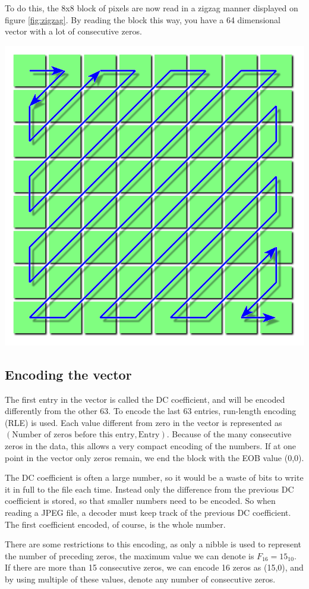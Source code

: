 \begin{infobox}
To do this, the 8x8 block of pixels are now read in a zigzag manner displayed on figure \ref{fig:zigzag}.
By reading the block this way, you have a 64 dimensional vector with a lot of consecutive zeros. 

\begin{centering}
\includegraphics[width=.5\textwidth]{figures/zigzagordering.png}
\label{fig:zigzag}
\end{centering} 

\vspace{4mm}
\subsection{Encoding the vector}
\vspace{-2.5mm}
The first entry in the vector is called the DC coefficient, and will be encoded differently from the other 63. To encode the last 63 entries, run-length encoding (RLE) is used. Each value different from zero in the vector is represented as $(\text{Number of zeros before this entry}, \text{Entry})$. Because of the many consecutive zeros in the data, this allows a very compact encoding of the numbers. If at one point in the vector only zeros remain, we end the block with the EOB value (0,0). 

The DC coefficient is often a large number, so it would be a waste of bits to write it in full to the file each time. Instead only the difference from the previous DC coefficient is stored, so that smaller numbers need to be encoded. So when reading a JPEG file, a decoder must keep track of the previous DC coefficient. The first coefficient encoded, of course, is the whole number.

There are some restrictions to this encoding, as only a nibble is used to represent the number of preceding zeros, the maximum value we can denote is $F_{16}=15_{10}$.
If there are more than 15 consecutive zeros, we can encode 16 zeros as (15,0), and by using multiple of these values, denote any number of consecutive zeros. 


\end{infobox}
